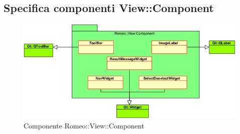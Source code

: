 \color{black}
\subsection{Specifica componenti View::Component}
\label{specificaCompon}
\begin{figure}[!h]

			\includegraphics[width=\linewidth]{../Specifica_Tecnica/Content/Immagini/Romeo__View__Component.png}
			\caption{Componente Romeo::View::Component}
			\label{comp_romeo::view::component}
\end{figure}
\pagebreak
